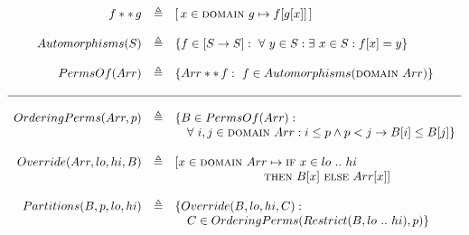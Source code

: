  {
\footnotesize
\begin{example}
\footnotesize
\[
\begin{array}{r c l} 
\vspace{-20pt}\\
f **\, g & \triangleq &  [\,x \in \kw{domain}\ g \mapsto f[g[x]]\,]\\
\\
Automorphisms(S) 
& \triangleq & \{ f \in [S \rightarrow S] :\ \forall\ y \in S : \exists\ x \in S : f[x] = y \}\\
\\
%
PermsOf(Arr) & \triangleq & \{ Arr **\, f :\ f \in Automorphisms(\kw{domain}\ Arr) \}\\
\\ \hline \\
%
OrderingPerms(Arr, p) & \triangleq &
  \{ B \in PermsOf(Arr) :\\ 
& & \hspace{10pt} \forall\ i,j \in \kw{domain}\ Arr
 : i \leq p \wedge p < j \rightarrow B[i] \leq B[j] \}\\
\\
%
Override(Arr, lo, hi, B) & \triangleq &
  [x \in \kw{domain}\ Arr \mapsto \kw{if}\ x \in lo\ ..\ hi\\
& & \hspace{74pt}  \kw{then}\ B[x]\ \kw{else}\ Arr[x]]\\
\\
%
Partitions(B, p, lo, hi) & \triangleq &
  \{ Override(B, lo, hi, C) : \\
& & \hspace{10pt} C \in OrderingPerms(Restrict(B, lo\ ..\ hi), p) \} \\
\end{array}
\]
\end{example}
}


